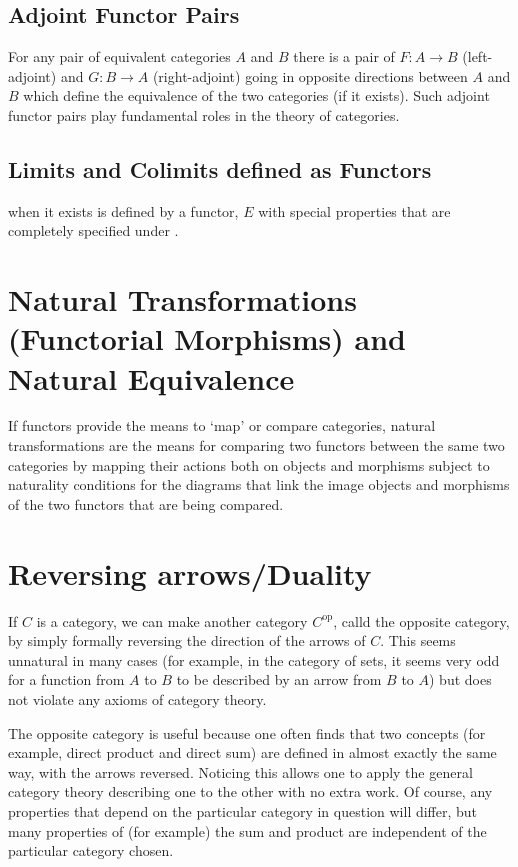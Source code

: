 \documentclass[12pt]{article}
\begin{document}
\subsection{Adjoint Functor Pairs}
For any pair of equivalent categories $A$ and $B$ there is a pair of  
$F: A \to B$ (left-adjoint) and $G: B \to A$ (right-adjoint) going in opposite directions between $A$ and $B$ which define the equivalence of the two categories (if it exists). Such adjoint functor pairs play fundamental roles in 
the theory of categories.

\subsection{Limits and Colimits defined as Functors}

when it exists is defined by a functor, $E$ with special properties that are completely specified under
.  

\section{Natural Transformations (Functorial Morphisms) and Natural Equivalence}
If functors provide the means to `map' or compare categories, natural transformations
are the means for comparing two functors between the same two categories by mapping their actions both on objects and morphisms subject to naturality conditions for the diagrams that link the image objects and morphisms
of the two functors that are being compared. 

\section{Reversing arrows/Duality}

If $C$ is a category, we can make another category $C^{\operatorname{op}}$, calld the opposite category, by simply formally reversing the direction of the arrows of $C$. This seems unnatural in many cases (for example, in the category of sets, it seems very odd for a function from $A$ to $B$ to be described by an arrow from $B$ to $A$) but does not violate any axioms of category theory. 

The opposite category is useful because one often finds that two concepts (for example, direct product and direct sum) are defined in almost exactly the same way, with the arrows reversed. Noticing this allows one to apply the general category theory describing one to the other with no extra work. Of course, any properties that depend on the particular category in question will differ, but many properties of (for example) the sum and product are independent of the particular category chosen. 
\end{document}
